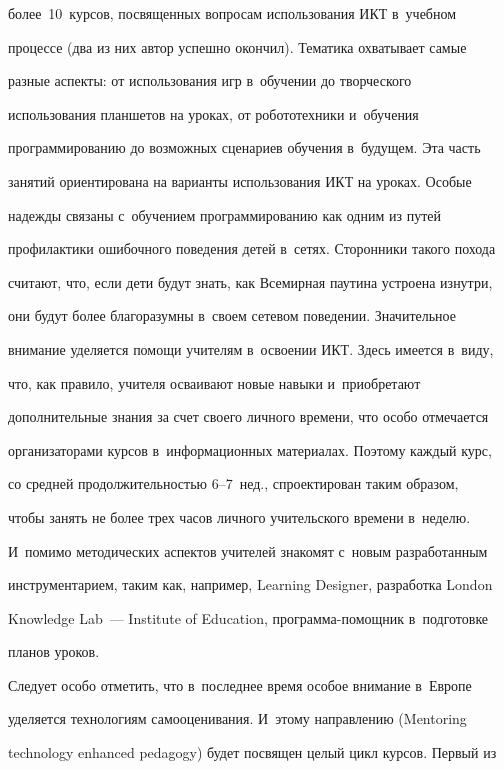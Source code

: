 более~10~курсов, посвященных вопросам использования ИКТ в~учебном 


процессе (два из них автор успешно окончил). Тематика охватывает самые 


разные аспекты: от использования игр в~обучении до творческого 


использования планшетов на уроках, от робототехники и~обучения 


программированию до возможных сценариев обучения в~будущем. Эта часть 


занятий ориентирована на варианты использования ИКТ на уроках. Особые 


надежды связаны с~обучением программированию как одним из путей 


профилактики ошибочного поведения детей в~сетях. Сторонники такого похода 


считают, что, если дети будут знать, как Всемирная паутина устроена изнутри, 


они будут более благоразумны в~своем сетевом поведении. Значительное 


внимание уделяется помощи учителям в~освоении ИКТ. Здесь имеется в~виду, 


что, как правило, учителя осваивают новые навыки и~приобретают 


дополнительные знания за счет своего личного времени, что особо отмечается 


организаторами курсов в~информационных материалах. Поэтому каждый курс, 


со средней продолжительностью 6--7~нед., спроектирован таким образом, 


чтобы занять не более трех часов личного учительского времени в~неделю. 


И~помимо методических аспектов учителей знакомят с~новым разработанным 


инструментарием, таким как, например, Learning Designer, разработка London 


Knowledge Lab~--- Institute of Education, программа-по\-мощ\-ник в~подготовке 


планов уроков. 


  


  Следует особо отметить, что в~последнее время особое внимание в~Европе 


уделяется технологиям самооценивания. И~этому направлению (Mentoring 


technology enhanced pedagogy) будет посвящен целый цикл курсов. Первый из 


